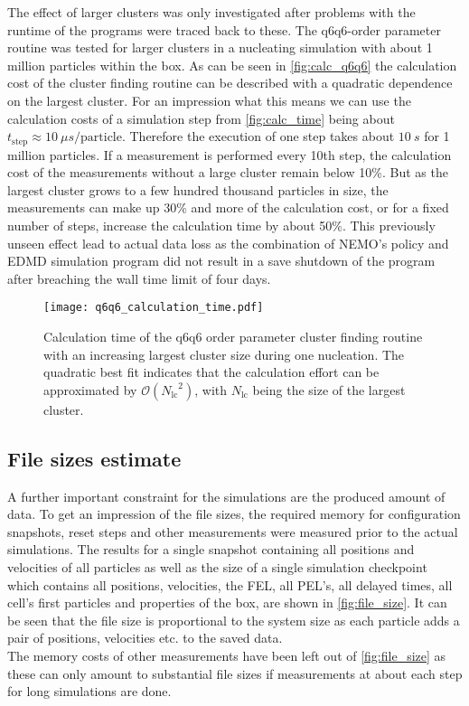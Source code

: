 The effect of larger clusters was only investigated after problems with the runtime of the programs were traced back to these. The q6q6-order parameter routine was tested for larger clusters in a nucleating simulation with about 1 million particles within the box. As can be seen in \autoref{fig:calc_q6q6} the calculation cost of the cluster finding routine can be described with a quadratic dependence on the largest cluster. For an impression what this means we can use the calculation costs of a simulation step from \autoref{fig:calc_time} being about $t_{\text{step}} \approx \SI{10}{\mu s \per \text{particle} }$. Therefore the execution of one step takes about $\SI{10}{s}$ for 1 million particles. If a measurement is performed every 10th step, the calculation cost of the measurements without a large cluster remain below 10\%. But as the largest cluster grows to a few hundred thousand particles in size, the measurements can make up 30\% and more of the calculation cost, or for a fixed number of steps, increase the calculation time by about 50\%. This previously unseen effect lead to actual data loss as the combination of NEMO's policy and EDMD simulation program did not result in a save shutdown of the program after breaching the wall time limit of four days.

\begin{figure}[h!]
\centering
\texttt{[image: q6q6\_calculation\_time.pdf]}
\caption[Quadratic calculation time of q6q6-order parameter cluster finding routine]{Calculation time of the q6q6 order parameter cluster finding routine with an increasing largest cluster size during one nucleation. The quadratic best fit indicates that the calculation effort can be approximated by $\mathcal{O}({N_{\text{lc}}}^2)$, with $N_{\text{lc}}$ being the size of the largest cluster.}
\label{fig:calc_q6q6}
\end{figure}

\subsection{File sizes estimate}
\label{sec:file_size}
A further important constraint for the simulations are the produced amount of data. To get an impression of the file sizes, the required memory for configuration snapshots, reset steps and other measurements were measured prior to the actual simulations. The results for a single snapshot containing all positions and velocities of all particles as well as the size of a single simulation checkpoint which contains all positions, velocities, the FEL, all PEL's, all delayed times, all cell's first particles and properties of the box, are shown in \autoref{fig:file_size}. It can be seen that the file size is proportional to the system size as each particle adds a pair of positions, velocities etc. to the saved data.\\
The memory costs of other measurements have been left out of \autoref{fig:file_size} as these can only amount to substantial file sizes if measurements at about each step for long simulations are done.\\  

